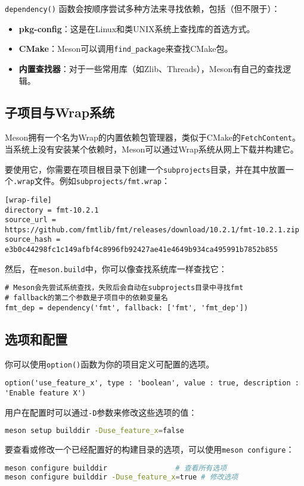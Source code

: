 \documentclass[../main.tex]{subfiles}
\begin{document}
\texttt{dependency()} 函数会按顺序尝试多种方法来寻找依赖，包括（但不限于）：
\begin{itemize}
  \item \textbf{pkg-config}：这是在Linux和类UNIX系统上查找库的首选方式。
  \item \textbf{CMake}：Meson可以调用\texttt{find\_package}来查找CMake包。
  \item \textbf{内置查找器}：对于一些常用库（如Zlib、Threads），Meson有自己的查找逻辑。
\end{itemize}

\subsection{子项目与Wrap系统}
Meson拥有一个名为Wrap的内置依赖包管理器，类似于CMake的\texttt{FetchContent}。当系统上没有安装某个依赖时，Meson可以通过Wrap系统从网上下载并构建它。

要使用它，你需要在项目根目录下创建一个\texttt{subprojects}目录，并在其中放置一个\texttt{.wrap}文件。例如\texttt{subprojects/fmt.wrap}：
\begin{lstlisting}
[wrap-file]
directory = fmt-10.2.1
source_url = https://github.com/fmtlib/fmt/releases/download/10.2.1/fmt-10.2.1.zip
source_hash = e3b0c44298fc1c149afbf4c8996fb92427ae41e4649b934ca495991b7852b855
\end{lstlisting}
然后，在\texttt{meson.build}中，你可以像查找系统库一样查找它：
\begin{lstlisting}
# Meson会先尝试系统查找，失败后会自动在subprojects目录中寻找fmt
# fallback的第二个参数是子项目中的依赖变量名
fmt_dep = dependency('fmt', fallback: ['fmt', 'fmt_dep'])
\end{lstlisting}

\subsection{选项和配置}
你可以使用\texttt{option()}函数为你的项目定义可配置的选项。
\begin{lstlisting}
option('use_feature_x', type : 'boolean', value : true, description : 'Enable feature X')
\end{lstlisting}
用户在配置时可以通过\texttt{-D}参数来修改这些选项的值：
\begin{lstlisting}[language=bash]
meson setup builddir -Duse_feature_x=false
\end{lstlisting}
要查看或修改一个已经配置好的构建目录的选项，可以使用\texttt{meson configure}：
\begin{lstlisting}[language=bash]
meson configure builddir                # 查看所有选项
meson configure builddir -Duse_feature_x=true # 修改选项
\end{lstlisting}
\end{document}

